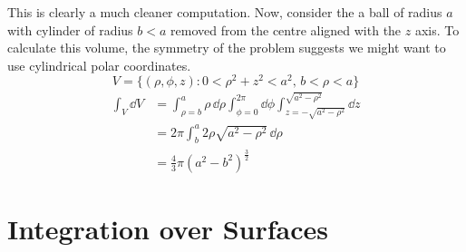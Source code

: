 \documentclass{article}
\begin{document}
This is clearly a much cleaner computation. Now, consider the a ball of radius $a$ with cylinder of radius $b<a$ removed from the centre aligned with the $z$ axis. To calculate this volume, the symmetry of the problem suggests we might want to use cylindrical polar coordinates.
\[ V = \{ (\rho, \phi, z) \colon 0 < \rho^2 + z^2 < a^2,\, b < \rho < a \} \]
\begin{align*}
    \int_V \dd V & = \int_{\rho=b}^a \rho\,\dd \rho \int_{\phi=0}^{2\pi} \dd \phi \int_{z=-\sqrt{a^2 - \rho^2}}^{\sqrt{a^2 - \rho^2}} \dd z \\
                 & = 2 \pi \int_b^a 2\rho\sqrt{a^2 - \rho^2}\,\dd \rho                                                                      \\
                 & = \frac{4}{3}\pi (a^2 - b^2)^{\frac{3}{2}}
\end{align*}

\section{Integration over Surfaces}
\end{document}
